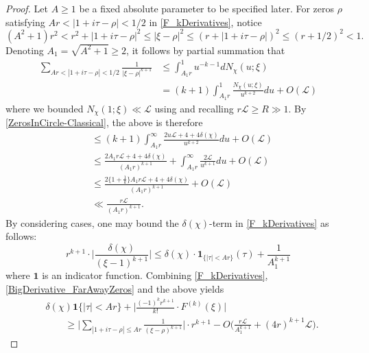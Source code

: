 \documentclass[12pt,psamsfonts]{amsart}
\theoremstyle{definition}
\theoremstyle{remark}
\numberwithin{equation}{section}
\theoremstyle{plain}
\theoremstyle{remark}
\renewcommand{\1}{ {\bf 1}}
\newcommand{\cL}{\mathcal{L}}
\begin{document}
\begin{proof}
Let  $A \geq 1$ be a fixed absolute parameter to be specified later. For zeros $\rho$ satisfying $Ar < |1+i\tau - \rho| < 1/2$ in \eqref{F_kDerivatives}, notice
\[
(A^2+1) r^2 < r^2 + |1+i\tau - \rho|^2 \leq |\xi-\rho|^2 \leq (r + |1+i\tau-\rho|)^2 \leq (r+1/2)^2 < 1.
\]
Denoting $A_1 = \sqrt{A^2+1} \geq 2$, it follows by partial summation that 
\begin{align*}
	\sum_{Ar < |1+i\tau-\rho| < 1/2 } \frac{1}{|\xi-\rho|^{k+1}} 
	& \leq \int_{A_1 r}^{1} u^{-k-1} dN_{\chi}(u; \xi ) \\
	& =  (k+1) \int_{A_1 r}^{1} \frac{N_{\chi}(u; \xi)}{u^{k+2}} du + O(\cL)
\end{align*}
where we bounded $N_{\chi}(1; \xi) \ll \cL$ using \cite[Lemma 2.2]{LMO} and recalling $r\cL \geq R \gg 1$. 
By \cref{ZerosInCircle-Classical}, the above is therefore
\begin{equation}
\begin{aligned}
& \leq (k+1)  \int_{A_1 r}^{\infty}  \frac{2u \cL +4 + 4\delta(\chi)}{u^{k+2}} du  + O(\cL )  \\
& \leq \frac{2A_1 r  \cL+ 4 + 4\delta(\chi)}{(A_1 r)^{k+1}} + \int_{A_1 r}^{\infty} \frac{2\cL}{u^{k+1}} du + O(\cL)  \\
& \leq \frac{ 2 \{ 1+ \tfrac{1}{k} \} A_1 r  \cL+ 4 + 4\delta(\chi)}{(A_1 r)^{k+1}} + O(\cL) \\
& \ll \frac{r \cL}{(A_1 r)^{k+1}} .
\end{aligned}
\label{BigDerivative_FarAwayZeros}
\end{equation}
 By considering cases, one may bound the $\delta(\chi)$-term in \eqref{F_kDerivatives} as follows:
\begin{equation}
r^{k+1} \cdot \Big| \frac{ \delta(\chi) }{(\xi-1)^{k+1}} \Big| \leq \delta(\chi) \cdot \mathbf{1}_{\{ |\tau| < Ar \}}(\tau) + \frac{1}{A_1^{k+1}} 
\label{BigDerivative_Principal}
\end{equation}
where $\mathbf{1}$ is an indicator function. Combining \eqref{F_kDerivatives}, \eqref{BigDerivative_FarAwayZeros} and the above yields
\begin{equation}
\begin{aligned}
& \delta(\chi) \mathbf{1}\{ |\tau| < Ar \}  + \Big| \frac{(-1)^k r^{k+1}}{k!} \cdot  F^{(k)}(\xi)  \Big|  \\
& \qquad \geq \Big| \sum_{|1+i\tau - \rho| \leq Ar} \frac{1}{(\xi-\rho)^{k+1}} \Big| \cdot r^{k+1} - O\Big(  \frac{r \cL}{A_1^{k+1}} + (4r)^{k+1} \cL\Big). 
\end{aligned}
\label{BigDerivative_UglyError}

\end{equation}
\end{proof}
\end{document}
